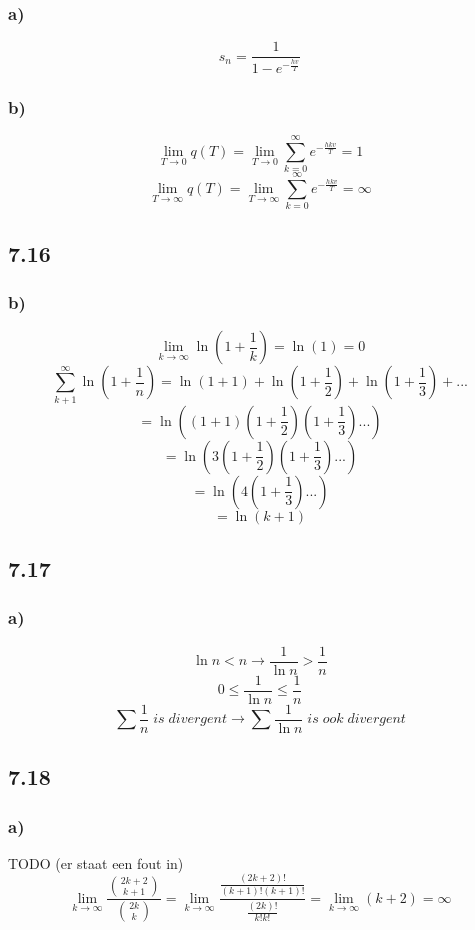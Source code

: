 \documentclass[11pt]{article}
\begin{document}
\subsubsection*{a)}
\[
s_n = \frac{1}{1-e^{-\frac{hv}{T}}}
\]
\subsubsection*{b)}
\[
\lim_{T\rightarrow 0}q(T) = \lim_{T\rightarrow 0}\sum_{k=0}^\infty e^{-\frac{hkv}{T}}
=1
\]
\[
\lim_{T\rightarrow \infty}q(T) =\lim_{T\rightarrow \infty}\sum_{k=0}^\infty e^{-\frac{hkv}{T}}
=\infty
\]

\subsection*{7.16}
\subsubsection*{b)}
\[
\lim_{k\rightarrow\infty}\ln\left(1+\frac{1}{k}\right)= \ln(1)=0
\]
\[
\sum_{k+1}^\infty \ln\left(1+\frac{1}{n}\right)= \ln(1+1) + \ln\left(1+\frac{1}{2}\right) + \ln\left(1+\frac{1}{3}\right) + ...
\]
\[
=\ln \left( (1+1)(1+\frac{1}{2})(1+\frac{1}{3})...\right)
\]
\[
=\ln \left( 3 (1+\frac{1}{2})(1+\frac{1}{3})...\right)
\]
\[
=\ln \left( 4(1+\frac{1}{3})...\right)
\]
\[
=\ln(k+1)
\]

\subsection*{7.17}
\subsubsection*{a)}
\[
\ln n < n \rightarrow \frac{1}{\ln n} > \frac{1}{n}
\]
\[
0 \le \frac{1}{\ln n} \le \frac{1}{n}
\]
\[
\sum\frac{1}{n}\;is\;divergent \rightarrow \sum\frac{1}{\ln n}\;is\;ook\;divergent
\]

\subsection*{7.18}
\subsubsection*{a)}
TODO (er staat een fout in)
\[
\lim_{k\rightarrow\infty}\frac{\binom{2k+2}{k+1}}{\binom{2k}{k}}
=
\lim_{k\rightarrow\infty}\frac{\frac{(2k+2)!}{(k+1)!(k+1)!}}{\frac{(2k)!}{k!k!}}
= 
\lim_{k\rightarrow\infty}(k+2)
=
\infty
\]
\end{document}
